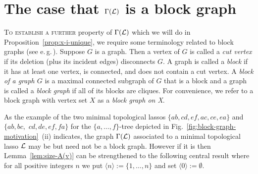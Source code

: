 \section{The case that $\Gamma({\mathcal L})$ is a block graph}
\label{sec:blockgraph}

\textsc{To establish a further} property of $\Gamma({\mathcal L})$ which we will do in
Proposition~\ref{prop:x-i-unique}, we require some terminology related to
block graphs (see e.\,g.\,\cite{diestel}).  Suppose $G$ is a graph. Then a
vertex of $G$ is called a {\em cut vertex} if its deletion (plus its incident
edges) disconnects $G$. A graph is called a {\em block} if it has at least one
vertex, is connected, and does not contain a cut vertex. A {\em block of a
  graph $G$} is a maximal connected subgraph of $G$ that is a block and a
graph is called a {\em block graph} if all of its blocks are cliques. For
convenience, we refer to a block graph with vertex set $X$ as a {\em block
  graph on X}.

As the example of the two minimal topological lassos $
\{ab,cd,ef,ac,ce,ea\}$ and $
\{ab, bc,$ $cd, de, ef, fa\}$ for the $\{a,\ldots,f\}$-tree depicted in
Fig.~\ref{fig:block-graph-motivation}~(ii) indicates, the graph $\Gamma({\mathcal L})$
associated to a minimal topological lasso ${\mathcal L}$ may be but need not be a block
graph.  However if it is then Lemma~\ref{lem:size-A(v)} can be strengthened to
the following central result where for all positive integers $n$ we put
$\langle n\rangle :=\{1,\ldots, n\}$ and set $\langle 0\rangle:=\emptyset$.

